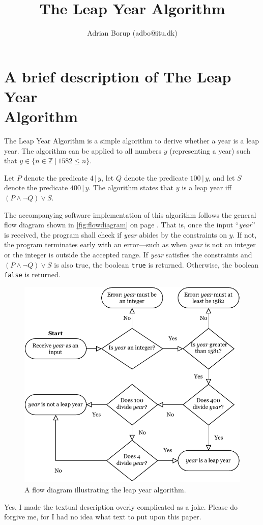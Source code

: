 \documentclass[a4paper, 12pt]{article}
\author{Adrian Borup (adbo@itu.dk)}
\title{\textbf{The Leap Year Algorithm}}
\begin{document}
  \maketitle
  \section{A brief description of The Leap Year\\Algorithm}
  The Leap Year Algorithm is a simple algorithm to derive whether a year is a leap year. The algorithm can be applied to all numbers $y$ (representing a year) such that $y \in \{ n \in \mathbb{Z} \ | \ 1582 \leq n \}$.

  Let $P$ denote the predicate $4\,|\,y$, let $Q$ denote the predicate $100\,|\,y$, and let $S$ denote the predicate $400\,|\,y$. The algorithm states that $y$ is a leap year iff $(P \land \lnot Q) \lor S$.

  The accompanying software implementation of this algorithm follows the general flow diagram shown in \autoref{fig:flowdiagram} on page \pageref{fig:flowdiagram}. That is, once the input ``\textit{year}'' is received, the program shall check if \textit{year} abides by the constraints on $y$. If not, the program terminates early with an error---such as when \textit{year} is not an integer or the integer is outside the accepted range. If \textit{year} satisfies the constraints and $(P \land \lnot Q) \lor S$ is also true, the boolean \texttt{true} is returned. Otherwise, the boolean \texttt{false} is returned.

  \begin{figure}[H]
    \centering
    \includegraphics[width=1\textwidth]{assets/IsLeapYear_algorithm.pdf}
    \caption{A flow diagram illustrating the leap year algorithm.}
    \label{fig:flowdiagram}
  \end{figure}
  \vfill
  \noindent
  {\footnotesize Yes, I made the textual description overly complicated as a joke. Please do forgive me, for I had no idea what text to put upon this paper.}
\end{document}
